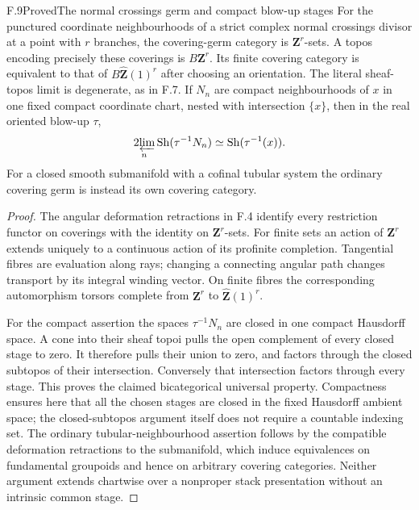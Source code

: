 \begin{statement}{F.9}{Proved}{The normal crossings germ and compact blow-up stages}
For the punctured coordinate neighbourhoods of a strict complex normal
crossings divisor at a point with $r$ branches, the covering-germ
category is $\mathbf Z^r$-sets. A topos encoding precisely these
coverings is $B\mathbf Z^r$. Its finite covering category is equivalent
to that of $B\widehat{\mathbf Z}(1)^r$ after choosing an orientation.
The literal sheaf-topos limit is degenerate, as in F.7.
If $N_n$ are compact neighbourhoods of $x$ in one fixed compact
coordinate chart, nested with intersection $\{x\}$, then in the real
oriented blow-up $\tau$,
\[
 \operatorname*{2\!\varprojlim}_n\operatorname{Sh}(\tau^{-1}N_n)
       \simeq\operatorname{Sh}(\tau^{-1}(x)).
\]
For a closed smooth submanifold with a cofinal tubular system the
ordinary covering germ is instead its own covering category.
\end{statement}
\begin{proof}
The angular deformation retractions in F.4 identify every restriction
functor on coverings with the identity on $\mathbf Z^r$-sets. For
finite sets an action of $\mathbf Z^r$ extends uniquely to a continuous
action of its profinite completion. Tangential fibres are evaluation
along rays; changing a connecting angular path changes transport by
its integral winding vector. On finite fibres the corresponding
automorphism torsors complete from $\mathbf Z^r$ to
$\widehat{\mathbf Z}(1)^r$.

For the compact assertion the spaces $\tau^{-1}N_n$ are closed in
one compact Hausdorff space. A cone into their sheaf topoi pulls the
open complement of every closed stage to zero. It therefore pulls
their union to zero, and factors through the closed subtopos of their
intersection. Conversely that intersection factors through every
stage. This proves the claimed bicategorical universal property.
Compactness ensures here that all the chosen stages are closed in the
fixed Hausdorff ambient space; the closed-subtopos argument itself
does not require a countable indexing set. The ordinary
tubular-neighbourhood assertion follows by the
compatible deformation retractions to the submanifold, which induce
equivalences on fundamental groupoids and hence on arbitrary covering
categories. Neither argument extends chartwise over a nonproper
stack presentation without an intrinsic common stage.
\end{proof}

